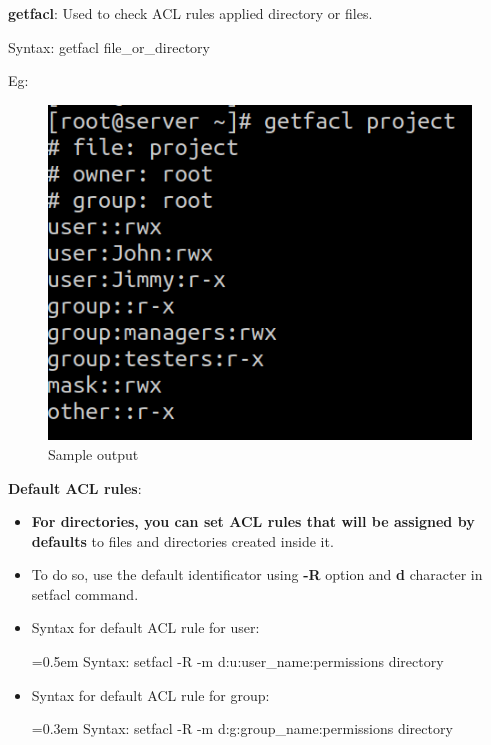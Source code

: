 \begin{flushleft}
	\bigskip
	\textbf{getfacl}: Used to check ACL rules applied directory or files.
	\begin{tcolorbox}[breakable,notitle,boxrule=-0pt,colback=pink,colframe=pink]
		\color{black}
		\font=9pt
		Syntax: getfacl  file\_or\_directory
		\font=4pt
	\end{tcolorbox}
	Eg:
	\begin{figure}[h!]
		\centering
		\includegraphics[scale=0.6]{content/chapter6/images/getfacl.png}
		\caption{Sample output}
		\label{fig:getfacl}
	\end{figure}
	
	
\newpage

\textbf{Default ACL rules}: 
\begin{itemize}
	\item \textbf{For directories, you can set ACL rules that will be assigned by defaults} to files and directories created inside it. 
	\item To do so, use the default identificator using \textbf{-R} option and \textbf{d} character in setfacl command.
	\item Syntax for default ACL rule for user:
	\bigskip
	\begin{tcolorbox}[breakable,notitle,boxrule=-0pt,colback=pink,colframe=pink]
		\color{black}
		\font=0.5em
		Syntax: setfacl -R -m d:u:user\_name:permissions directory
		\font=4pt
	\end{tcolorbox}

	\item Syntax for default ACL rule for group:
	\bigskip
	\begin{tcolorbox}[breakable,notitle,boxrule=-0pt,colback=pink,colframe=pink]
		\color{black}
		\font=0.3em
		Syntax: setfacl -R -m d:g:group\_name:permissions directory
		\font=4pt
	\end{tcolorbox}


\end{itemize}
\end{flushleft}
